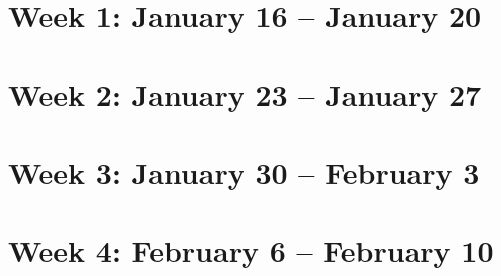 \section{Week 1: January 16 -- January 20}

\section{Week 2: January 23 -- January 27}

\section{Week 3: January 30 -- February 3}

\section{Week 4: February 6 -- February 10}